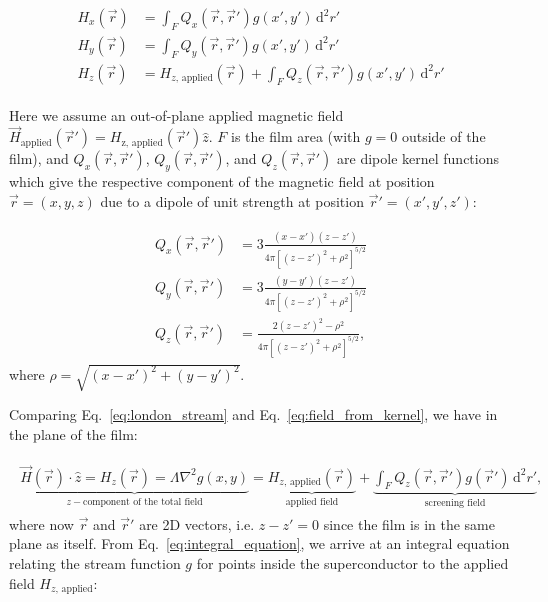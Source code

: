 \documentclass[final,3p,times]{elsarticle}
\newcounter{bla}
\begin{document}
\begin{align}
    \label{eq:field_from_kernel}
    \begin{split}
        H_x(\vec{r}) &= \int_F Q_x(\vec{r},\vec{r}')g(x', y')\,\mathrm{d}^2r'\\
        H_y(\vec{r}) &= \int_F Q_y(\vec{r},\vec{r}')g(x', y')\,\mathrm{d}^2r'\\
        H_z(\vec{r}) &= H_{z,\,\mathrm{applied}}(\vec{r})
        + \int_F Q_z(\vec{r},\vec{r}')g(x', y')\,\mathrm{d}^2r'  
    \end{split}
\end{align}

Here we assume an out-of-plane applied magnetic field $\vec{H}_\mathrm{applied}(\vec{r}')=H_\mathrm{z,\,\mathrm{applied}}(\vec{r}')\hat{z}$. $F$ is the film area (with $g = 0$ outside of the film), and $Q_x(\vec{r},\vec{r}')$, $Q_y(\vec{r},\vec{r}')$, and $Q_z(\vec{r},\vec{r}')$ are dipole kernel functions which give the respective component of the magnetic field at position $\vec{r}=(x, y, z)$ due to a dipole of unit strength at position $\vec{r}'=(x', y', z')$:

\begin{align}
    \label{eq:kernels}
    \begin{split}
        Q_x(\vec{r}, \vec{r}') &=  3\frac{(x-x')(z-z')}
        {4\pi[(z-z')^2+\rho^2]^{5/2}}\\
        Q_y(\vec{r}, \vec{r}') &=  3\frac{(y-y')(z-z')}
        {4\pi[(z-z')^2+\rho^2]^{5/2}}\\
        Q_z(\vec{r}, \vec{r}') &=  \frac{2(z-z')^2-\rho^2}
        {4\pi[(z-z')^2+\rho^2]^{5/2}},
    \end{split}
\end{align}
where $\rho=\sqrt{(x-x')^2 + (y-y')^2}$.

Comparing Eq.~\ref{eq:london_stream} and Eq.~\ref{eq:field_from_kernel}, we have in the plane of the film:

\begin{align}
    \label{eq:integral_equation}
    \begin{split}
        \underbrace{\vec{H}(\vec{r})\cdot\hat{z} = H_z(\vec{r})
        = \Lambda\nabla^2g(x, y)}_{z-\text{component of the total field}}
        = \underbrace{H_{z,\,\mathrm{applied}}(\vec{r})}_{\text{applied field}}
        + \underbrace{\int_F Q_z(\vec{r},\vec{r}')g(\vec{r}')\,\mathrm{d}^2r'}_{\text{screening field}},
    \end{split}
\end{align}
where now $\vec{r}$ and $\vec{r}'$ are 2D vectors, i.e. $z-z'=0$ since the film is in the same plane as itself. From Eq.~\ref{eq:integral_equation}, we arrive at an integral equation relating the stream function $g$ for points inside the superconductor to the applied field $H_{z,\,\mathrm{applied}}$:
\end{document}
